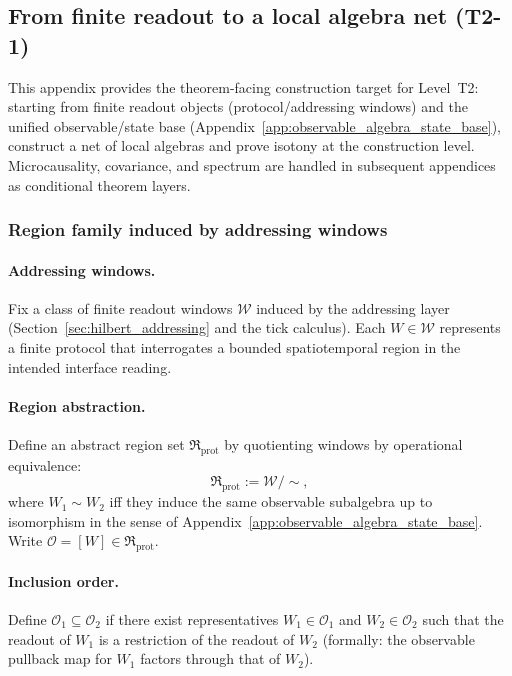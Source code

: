 \subsection{From finite readout to a local algebra net (T2-1)}
\label{app:construct_local_net_from_protocol}

\AuditTag This appendix provides the theorem-facing construction target for Level~T2: starting from finite readout objects (protocol/addressing windows) and the unified observable/state base (Appendix~\ref{app:observable_algebra_state_base}), construct a net of local algebras and prove isotony at the construction level.
Microcausality, covariance, and spectrum are handled in subsequent appendices as conditional theorem layers.

\subsubsection{Region family induced by addressing windows}
\paragraph{Addressing windows.}
\InterfaceTag Fix a class of finite readout windows $\mathcal{W}$ induced by the addressing layer (Section~\ref{sec:hilbert_addressing} and the tick calculus).
Each $W\in\mathcal{W}$ represents a finite protocol that interrogates a bounded spatiotemporal region in the intended interface reading.

\paragraph{Region abstraction.}
Define an abstract region set $\mathfrak{R}_{\mathrm{prot}}$ by quotienting windows by operational equivalence:
\[
\mathfrak{R}_{\mathrm{prot}}:=\mathcal{W}/\sim,
\]
where $W_1\sim W_2$ iff they induce the same observable subalgebra up to isomorphism in the sense of Appendix~\ref{app:observable_algebra_state_base}.
Write $\mathcal{O}=[W]\in\mathfrak{R}_{\mathrm{prot}}$.

\paragraph{Inclusion order.}
Define $\mathcal{O}_1\subseteq\mathcal{O}_2$ if there exist representatives $W_1\in\mathcal{O}_1$ and $W_2\in\mathcal{O}_2$ such that the readout of $W_1$ is a restriction of the readout of $W_2$ (formally: the observable pullback map for $W_1$ factors through that of $W_2$).

